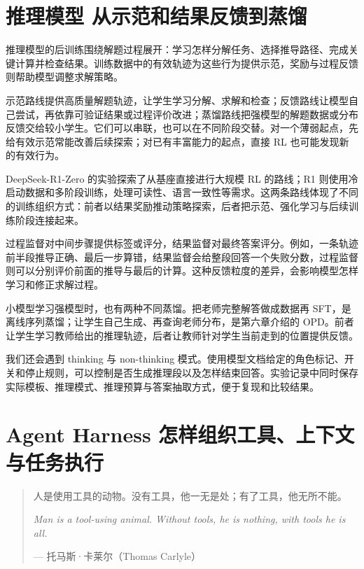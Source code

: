 \section{推理模型 从示范和结果反馈到蒸馏}\label{推理模型 从示范和结果反馈到蒸馏}

推理模型的后训练围绕解题过程展开：学习怎样分解任务、选择推导路径、完成关键计算并检查结果。训练数据中的有效轨迹为这些行为提供示范，奖励与过程反馈则帮助模型调整求解策略。

示范路线提供高质量解题轨迹，让学生学习分解、求解和检查；反馈路线让模型自己尝试，再依靠可验证结果或过程评价改进；蒸馏路线把强模型的解题数据或分布反馈交给较小学生。它们可以串联，也可以在不同阶段交替。对一个薄弱起点，先给有效示范常能改善后续探索；对已有丰富能力的起点，直接 RL 也可能发现新的有效行为。

DeepSeek-R1-Zero 的实验探索了从基座直接进行大规模 RL 的路线；R1 则使用冷启动数据和多阶段训练，处理可读性、语言一致性等需求。这两条路线体现了不同的训练组织方式：前者以结果奖励推动策略探索，后者把示范、强化学习与后续训练阶段连接起来。

过程监督对中间步骤提供标签或评分，结果监督对最终答案评分。例如，一条轨迹前半段推导正确、最后一步算错，结果监督会给整段回答一个失败分数，过程监督则可以分别评价前面的推导与最后的计算。这种反馈粒度的差异，会影响模型怎样学习和修正求解过程。

小模型学习强模型时，也有两种不同蒸馏。把老师完整解答做成数据再 SFT，是离线序列蒸馏；让学生自己生成、再查询老师分布，是第六章介绍的 OPD。前者让学生学习教师给出的推理轨迹，后者让教师针对学生当前走到的位置提供反馈。

我们还会遇到 thinking 与 non-thinking 模式。使用模型文档给定的角色标记、开关和停止规则，可以控制是否生成推理段以及怎样结束回答。实验记录中同时保存实际模板、推理模式、推理预算与答案抽取方式，便于复现和比较结果。


\section{Agent Harness 怎样组织工具、上下文与任务执行}\label{工具调用推理}\label{智能体运行框架}

\begin{quote}
人是使用工具的动物。没有工具，他一无是处；有了工具，他无所不能。

\textit{Man is a tool-using animal. Without tools, he is nothing, with tools he is all.}

\hfill --- 托马斯·卡莱尔（Thomas Carlyle）
\end{quote}

